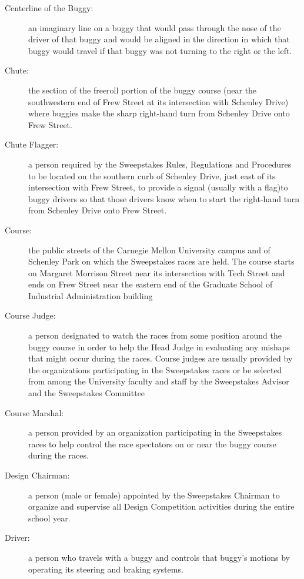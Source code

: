 \begin{description}
	\item[Centerline of the Buggy:]
	an imaginary line on a buggy that would pass through the nose of the driver of that buggy and would be aligned in the direction in which that buggy would travel if that buggy was not turning to the right or the left.

	\item[Chute:]
	the section of the freeroll portion of the buggy course (near the southwestern end of Frew Street at its intersection with Schenley Drive) where buggies make the sharp right-hand turn from Schenley Drive onto Frew Street.

	\item[Chute Flagger:]
	a person required by the Sweepstakes Rules, Regulations and Procedures to be located on the southern curb of Schenley Drive, just east of its intersection with Frew Street, to provide a signal (usually with a flag)to buggy drivers so that those drivers know when to start the right-hand turn from Schenley Drive onto Frew Street.

	\item[Course:]
	the public streets of the Carnegie Mellon University campus and of Schenley Park on which the Sweepstakes races are held. The course starts on Margaret Morrison Street near its intersection with Tech Street and ends on Frew Street near the eastern end of the Graduate School of Industrial Administration building

	\item[Course Judge:]
	a person designated to watch the races from some position around the buggy course in order to help the Head Judge in evaluating any mishaps that might occur during the races. Course judges are usually provided by the organizations participating in the Sweepstakes races or be selected from among the University faculty and staff by the Sweepstakes Advisor and the Sweepstakes Committee

	\item[Course Marshal:]
	a person provided by an organization participating in the Sweepstakes races to help control the race spectators on or near the buggy course during the races.

	\item[Design Chairman:]
	a person (male or female) appointed by the Sweepstakes Chairman to organize and supervise all Design Competition activities during the entire school year.

	\item[Driver:]
	a person who travels with a buggy and controls that buggy's motions by operating its steering and braking systems.


\end{description}
